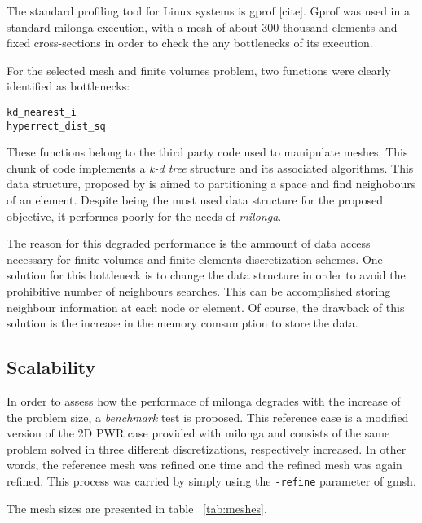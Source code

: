 \documentclass{anstrans}
\begin{document}
The standard profiling tool for Linux systems is gprof [cite]. Gprof was used in a standard milonga
execution, with a mesh of about 300 thousand elements and fixed cross-sections in order to check
the any bottlenecks of its execution.

For the selected mesh and finite volumes problem, two functions were clearly identified as bottlenecks:
\begin{verbatim}
kd_nearest_i
hyperrect_dist_sq
\end{verbatim}

These functions belong to the third party code used to manipulate meshes. This chunk of code implements
a \textit{k-d tree} structure and its associated algorithms. This data structure, proposed by \cite{Bentley1975}
is aimed to partitioning a space and find neighobours of an element. Despite being the most used data
structure for the proposed objective, it performes poorly for the needs of \textit{milonga}.

The reason for this degraded performance is the ammount of data access necessary for finite volumes
and finite elements discretization schemes. One solution for this bottleneck is to change the data structure
in order to avoid the prohibitive number of neighbours searches. This can be accomplished storing neighbour
information at each node or element. Of course, the drawback of this solution is the increase in the memory
comsumption to store the data.

\subsection{Scalability}

In order to assess how the performace of milonga degrades with the increase of the problem size, a \textit{benchmark}
test is proposed. This reference case is a modified version of the 2D PWR case provided with milonga \cite{milonga}
and consists of the same problem solved in three different discretizations, respectively increased. In other words,
the reference mesh was refined one time and the refined mesh was again refined. This process was carried by simply
using the \texttt{-refine} parameter of gmsh.

The mesh sizes are presented in table ~\ref{tab:meshes}.
\end{document}
